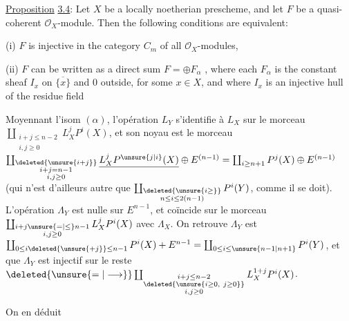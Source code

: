 \uline{Proposition} \uline{3.4}: Let $X$ be a locally noetherian prescheme, and let $F$ be a quasi-coherent $\mathscr{O}_X$-module. Then the following conditions are equivalent:

(i) $F$ is injective in the category $C_m$ of all $\mathscr{O}_X$-modules,

(ii) $F$ can be written as a direct sum $F=\oplus F_\alpha$ , where each $F_\alpha$ is the constant sheaf $I_x$ on $\overline{\{x\}}$ and $0$ outside, for some $x\in X$, and where $I_x$ is an injective hull of the residue field

 Moyennant l'isom $(\alpha)$, l'opération $L_Y$ s'identifie à $L_X$ sur le morceau $\coprod_{\substack{i+j\leq n-2\\i,j\geq0}}L_X^jP^i(X)$, et son noyau est le morceau $\coprod_{\substack{\deleted{\unsure{i+j}}\\i+j=n-1\\i,j\geq0}}\underline{L_X^jP^{\unsure{j|i}}(X)}\oplus E^{(n-1)}=\coprod_{i\geq n+1}P^j(X)\oplus E^{(n-1)}$ (qui n'est d'ailleurs autre que $\coprod_{\substack{\deleted{\unsure{i\geq}}\\n\leq i\leq2(n-1)}}P^i(Y)$, comme il se doit). L'opération $\Lambda_Y$ est nulle sur $E^{n-1}$, et coïncide sur le morceau $\coprod_{\substack{i+j\unsure{=|\leq} n-1\\i,j\geq0}}L_X^jP^i(X)$ avec $\Lambda_X$. On retrouve   $\Lambda_Y$  est $\coprod_{0\leq i\deleted{\unsure{+j}}\leq n-1}P^i(X)+E^{n-1}=\coprod_{0\leq i\leq \unsure{n-1|n+1}}P^i(Y)$,  et que $\Lambda_Y$ est injectif sur le reste $\deleted{\unsure{=|\longrightarrow}}\coprod_{\substack{i+j\leq n-2\\\deleted{\unsure{i\geq0,\ j\geq0}}\\i,j\geq0}}L_X^{1+j}P^i(X)$.

On en déduit

